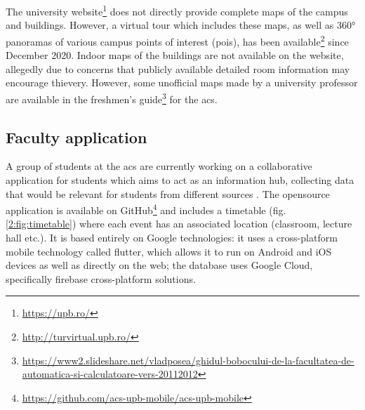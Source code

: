         The university website\footnote{\url{https://upb.ro/}} does not directly provide complete maps of the campus and buildings. However, a virtual tour which includes these maps, as well as 360° panoramas of various campus points of interest (\acrshort{poi}s), has been available\footnote{\url{http://turvirtual.upb.ro/}} since December 2020. Indoor maps of the buildings are not available on the website, allegedly due to concerns that publicly available detailed room information may encourage thievery. However, some unofficial maps made by a university professor are available in the freshmen's guide\footnote{\url{https://www2.slideshare.net/vladposea/ghidul-bobocului-de-la-facultatea-de-automatica-si-calculatoare-vers-20112012}} for the \acrlong{acs}.
        
    \subsection{Faculty application} \label{1:faculty_app}
    
        A group of students at the \acrlong{acs} are currently working on a collaborative application for students which aims to act as an information hub, collecting data that would be relevant for students from different sources \cite{alexandru2020acsupbmobile}. The \gls{opensource} application is available on GitHub\footnote{\url{https://github.com/acs-upb-mobile/acs-upb-mobile}} and includes a timetable (fig. \ref{2:fig:timetable}) where each event has an associated location (classroom, lecture hall etc.). It is based entirely on Google technologies: it uses a cross-platform mobile technology called \gls{flutter}, which allows it to run on Android and iOS devices as well as directly on the web; the database uses Google Cloud, specifically \gls{firebase} cross-platform solutions.
    
